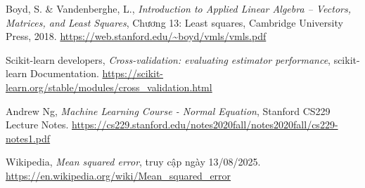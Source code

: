 \begin{thebibliography}{9}

  Boyd, S. \& Vandenberghe, L.,
  \textit{Introduction to Applied Linear Algebra -- Vectors, Matrices, and Least Squares}, Chương 13: Least squares, Cambridge University Press, 2018.
  \newline
  \url{https://web.stanford.edu/~boyd/vmls/vmls.pdf}

  Scikit-learn developers,
  \textit{Cross-validation: evaluating estimator performance}, scikit-learn Documentation.
  \newline
  \url{https://scikit-learn.org/stable/modules/cross_validation.html}

  Andrew Ng,
  \textit{Machine Learning Course - Normal Equation}, Stanford CS229 Lecture Notes.
  \newline
  \url{https://cs229.stanford.edu/notes2020fall/notes2020fall/cs229-notes1.pdf}

  Wikipedia,
  \textit{Mean squared error}, truy cập ngày 13/08/2025.
  \newline
  \url{https://en.wikipedia.org/wiki/Mean_squared_error}

\end{thebibliography}

